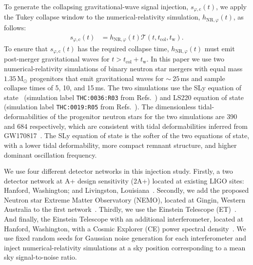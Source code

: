 \documentclass[
reprint,
prd,
twocolumn,
nofootinbib,
tightenlines %
floatfix,
 amsmath,
showpacs ,amssymb, aps,%
superscriptaddress
]{revtex4-1}
\newcommand{\tc}{t_{\mathrm{col}}}
\newcommand{\tw}{t_{\mathrm{w}}}
\begin{document}
    To generate the collapsing gravitational-wave signal injection, $s_{\varphi,\mathrm{c}}(t)$, we apply the Tukey collapse window to the numerical-relativity simulation, $h_{\mathrm{NR},\varphi}(t)$, as follows: 
    \begin{align}
        s_{\varphi,\mathrm{c}}(t) & =  h_{\mathrm{NR},\varphi}(t)\mathcal{T}\left(t , \tc,\tw\right). \label{eq:scol}
    \end{align}
    To ensure that $s_{\varphi,\mathrm{c}}(t)$ has the required collapse time, $h_{\mathrm{NR},\varphi}(t)$ must emit post-merger gravitational waves for $t>\tc+\tw$.
    In this paper we use two numerical-relativity simulations of binary neutron star mergers with equal mass $1.35\,\mathrm{M}_\odot$ progenitors that emit gravitational waves for $\sim~25$\,ms and sample collapse times of 5, 10, and 15\,ms.
    The two simulations use the SLy equation of state~\cite{Douchin2001} (simulation label \texttt{THC:0036:R03} from Refs.~\cite{Dietrich2018,Radice2016}) and LS220 equation of state~\cite{Lattimer1991} (simulation label \texttt{THC:0019:R05} from Refs.~\cite{Dietrich2018,Radice2017}).
    The dimensionless tidal-deformabilities of the progenitor neutron stars for the two simulations are 390 and 684 respectively, which are consistent with tidal deformabilities inferred from GW170817~\cite{GW170817Properties}.
    The SLy equation of state is the softer of the two equations of state, with a lower tidal deformability, more compact remnant structure, and higher dominant oscillation frequency.\par
    
    We use four different detector networks in this injection study.
    Firstly, a two detector network at A+ design sensitivity (2A+) located at existing LIGO sites: Hanford, Washington; and Livingston, Louisiana~\cite{Abbott2020Prospects,PSD:Aplus}. 
    Secondly, we add the proposed Neutron star Extreme Matter Observatory (NEMO), located at Gingin, Western Australia to the first network~\cite{NEMO2020}.
    Thirdly, we use the Einstein Telescope (ET)~\cite{Hild2008,Punturo2010,Hild2011, PSD:ET}.
    And finally, the Einstein Telescope with an additional interferometer, located at Hanford, Washington, with a Cosmic Explorer (CE) power spectral density~\cite{Abbott2017b, Adhikari2019,PSD:CE}.
    We use fixed random seeds for Gaussian noise generation for each interferometer and inject numerical-relativity simulations at a sky position corresponding to a mean sky signal-to-noise ratio. 
    \par
      
\end{document}
